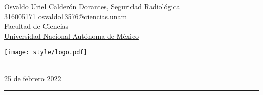 

\pagestyle{fancy}
\fancyhf{}
\makeatletter
\def\@seccntformat#1{%
  \expandafter\ifx\csname c@#1\endcsname\c@section\else
  \csname the#1\endcsname\quad
  \fi}
\makeatother

\begin{flushleft}
Osvaldo Uriel Calderón Dorantes, \hfill Seguridad Radiológica\\
316005171 \hfill osvaldo13576@ciencias.unam  \\
Facultad de Ciencias\\
\underline{Universidad Nacional Autónoma de México}
\end{flushleft}

\begin{flushright}\vspace{-5mm}
\texttt{[image: style/logo.pdf]}
\end{flushright}
 
\begin{center}\vspace{-1cm}
\textbf{ \large {}}\\
25 de febrero 2022
\end{center}
\medskip\hrule\bigskip

